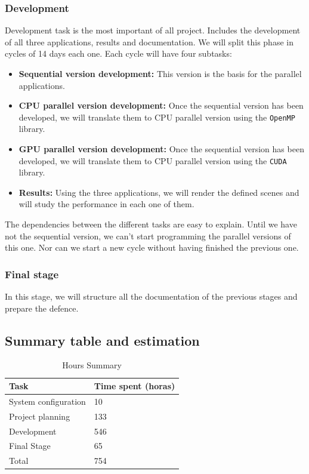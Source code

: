 \documentclass[titlepage,12pt]{report}
\begin{document}
\subsubsection{Development}

Development task is the most important of all project. Includes the development of all three applications, results and documentation. We will split this phase in cycles of 14 days each one. Each cycle will have four subtasks:

\begin{itemize}

	\item \textbf{Sequential version development:} This version is the basis for the parallel applications.
	
	\item \textbf{CPU parallel version development:} Once the sequential version has been developed, we will translate them to CPU parallel version using the \texttt{OpenMP} library. 
	
	\item \textbf{GPU parallel version development:} Once the sequential version has been developed, we will translate them to CPU parallel version using the \texttt{CUDA} library. 

	\item \textbf{Results:} Using the three applications, we will render the defined scenes and will study the performance in each one of them.

\end{itemize}

The dependencies between the different tasks are easy to explain. Until we have not the sequential version, we can't start programming the parallel versions of this one. Nor can we start a new cycle without having finished the previous one.

\subsubsection{Final stage}

In this stage, we will structure all the documentation of the previous stages and prepare the defence.

\subsection{Summary table and estimation}

\begin{table}[H]
	\centering
	\begin{tabular}{|m{5cm}||m{5cm}|}
		\hline
		Task & Time spent (horas) \\ \hline \hline
		System configuration & 10 \\ \hline
		Project planning & 133 \\ \hline
		Development & 546 \\ \hline
		Final Stage & 65 \\ \hline \hline
		Total & 754 \\ \hline
	\end{tabular}
	\caption{Hours Summary}
\end{table}
\end{document}
